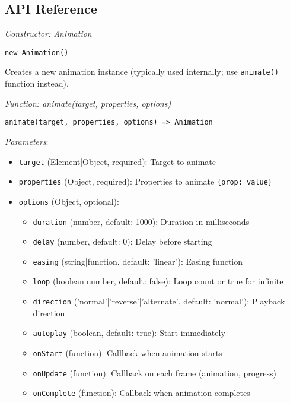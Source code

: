 \documentclass[11pt]{article}
\begin{document}
\subsection{API Reference}
\label{sec:org139136f}

\emph{Constructor: Animation}

\begin{verbatim}
new Animation()
\end{verbatim}

Creates a new animation instance (typically used internally; use \texttt{animate()} function instead).

\emph{Function: animate(target, properties, options)}

\begin{verbatim}
animate(target, properties, options) => Animation
\end{verbatim}

\emph{Parameters}:

\begin{itemize}
\item \texttt{target} (Element|Object, required): Target to animate
\item \texttt{properties} (Object, required): Properties to animate \texttt{\{prop: value\}}
\item \texttt{options} (Object, optional):
\begin{itemize}
\item \texttt{duration} (number, default: 1000): Duration in milliseconds
\item \texttt{delay} (number, default: 0): Delay before starting
\item \texttt{easing} (string|function, default: 'linear'): Easing function
\item \texttt{loop} (boolean|number, default: false): Loop count or true for infinite
\item \texttt{direction} ('normal'|'reverse'|'alternate', default: 'normal'): Playback direction
\item \texttt{autoplay} (boolean, default: true): Start immediately
\item \texttt{onStart} (function): Callback when animation starts
\item \texttt{onUpdate} (function): Callback on each frame (animation, progress)
\item \texttt{onComplete} (function): Callback when animation completes
\end{itemize}
\end{itemize}
\end{document}
